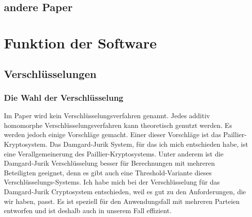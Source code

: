 \documentclass[a4paper,10pt]{scrartcl}
\begin{document}
\subsection{andere Paper}


\section{Funktion der Software}
\subsection{Verschlüsselungen}
\subsubsection{Die Wahl der Verschlüsselung}
Im Paper \cite{Doettling2021} wird kein Verschlüsselungsverfahren genannt. Jedes additiv homomorphe Verschlüsselungsverfahren kann theoretisch genutzt werden. Es werden jedoch einige Vorschläge  gemacht. Einer dieser Vorschläge ist das Paillier-Kryptosystem. Das Damgard-Jurik System, für das ich mich entschieden habe, ist eine Verallgemeinerung des Paillier-Kryptosystems. Unter anderem ist die Damgard-Jurik Verschlüsselung besser für Berechnungen mit mehreren Beteiligten geeignet, denn es gibt auch eine Threshold-Variante dieses Verschlüsselungs-Systems. \cite{IvanDamgard2004}
Ich habe mich bei der Verschlüsselung für das Damgard-Jurik Cryptosystem entschieden, weil es gut zu den Anforderungen, die wir haben, passt. Es ist speziell für den Anwendungsfall mit mehreren Parteien entworfen und ist deshalb auch in unserem Fall effizient.\\
\end{document}
